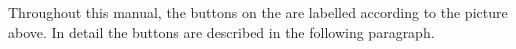 \begin{center}
{ }
\end{center}

Throughout this manual, the buttons on the \dap{} are labelled according to the
picture above. In detail the buttons are described in the following paragraph.

